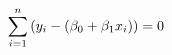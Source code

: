 \documentclass[preview]{standalone}
\begin{document}
\begin{align*}
\special{dvisvgm:raw <g id='unique000'>}\sum_{i=1}^n{(y_i-(\beta_0+\beta_1 x_i))}=0\special{dvisvgm:raw </g>}
\end{align*}
\end{document}
